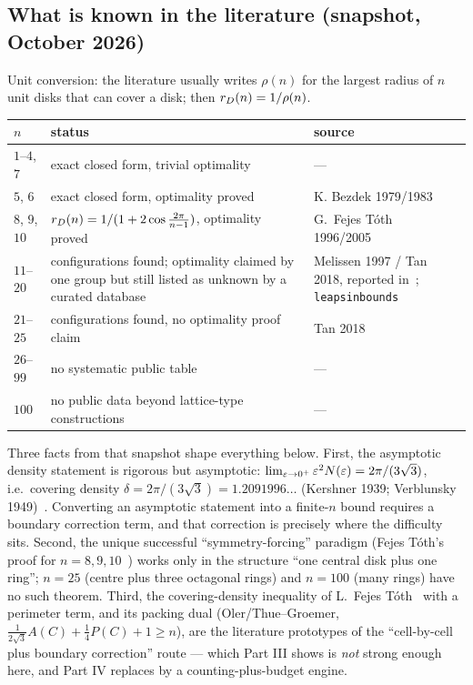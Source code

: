 \subsection{What is known in the literature (snapshot, October 2026)}

Unit conversion: the literature usually writes $\rho(n)$ for the largest radius of $n$ unit disks
that can cover a disk; then $r_{D}(n)=1/\rho(n)$.

\begin{center}
\footnotesize
\begin{tabular}{@{}>{\raggedright\arraybackslash}p{}>{\raggedright\arraybackslash}p{}>{\raggedright\arraybackslash}p{}@{}}
\toprule
$n$ & status & source \\
\midrule
$1$--$4$, $7$ & exact closed form, trivial optimality & --- \\
$5$, $6$ & exact closed form, optimality proved & K. Bezdek 1979/1983~\cite{bezdek1983} \\
$8$, $9$, $10$ & $r_{D}(n)=1/(1+2\cos\frac{2\pi}{n-1})$, optimality proved &
G.~Fejes T\'oth 1996/2005~\cite{fejesthesg2005} \\
$11$--$20$ & configurations found; optimality claimed by one group but still
listed as unknown by a curated database & Melissen 1997 / Tan 2018, reported
in~\cite{friedman-circovcir}; \texttt{leapsinbounds}~\cite{leapsinbounds} \\
$21$--$25$ & configurations found, no optimality proof claim & Tan 2018~\cite{friedman-circovcir} \\
$26$--$99$ & no systematic public table & --- \\
$100$ & no public data beyond lattice-type constructions & --- \\
\bottomrule
\end{tabular}
\end{center}

Three facts from that snapshot shape everything below. First, the asymptotic density statement is
rigorous but asymptotic: $\lim_{\varepsilon\to0^+}\varepsilon^2N(\varepsilon)=2\pi/(3\sqrt3)$, i.e.\ covering density
$\delta=2\pi/(3\sqrt3)=1.2091996\ldots$ (Kershner 1939; Verblunsky
1949)~\cite{kershner1939,verblunsky1949}. Converting an asymptotic
statement into a finite-$n$ bound requires a boundary correction term, and that correction is
precisely where the difficulty sits. Second, the unique successful ``symmetry-forcing'' paradigm
(Fejes T\'oth's proof for $n=8,9,10$~\cite{fejesthesg2005}) works only in the structure ``one central disk plus one
ring''; $n=25$ (centre plus three octagonal rings) and $n=100$ (many rings) have no such theorem.
Third, the covering-density inequality of L.~Fejes T\'oth~\cite{fejesthesl1950} with a perimeter term, and its packing
dual (Oler/Thue--Groemer, $\frac{1}{2\sqrt3}A(C)+\frac14P(C)+1\ge n$), are the literature
prototypes of the ``cell-by-cell plus boundary correction'' route --- which Part III shows is
\emph{not} strong enough here, and Part IV replaces by a counting-plus-budget engine.

